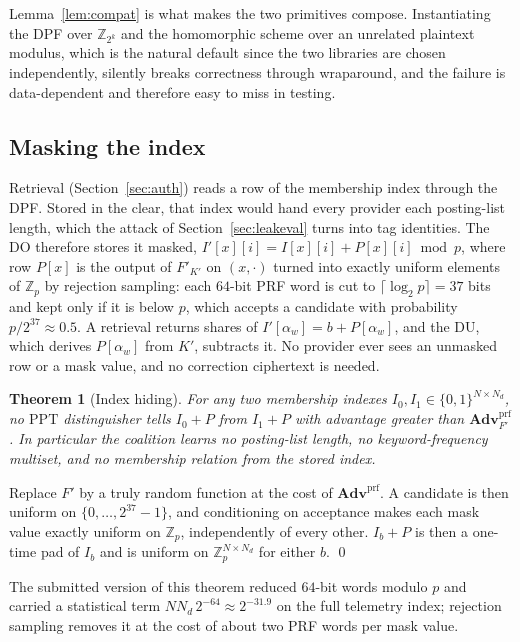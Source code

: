 \documentclass[a4paper,fleqn]{cas-dc}
\newif\ifauthorchecks
\newcommand{\authorcheck}[1]{\ifauthorchecks{\color{red}\textsf{[Authors: #1]}}\fi}
\newtheorem{theorem}{Theorem}
\newcommand{\PPT}{\mathrm{PPT}}
\newcommand{\advPRF}{\mathbf{Adv}^{\mathrm{prf}}}
\begin{document}
Lemma~\ref{lem:compat} is what makes the two primitives compose. Instantiating
the DPF over $\mathbb{Z}_{2^k}$ and the homomorphic scheme over an unrelated
plaintext modulus, which is the natural default since the two libraries are
chosen independently, silently breaks correctness through wraparound, and the
failure is data-dependent and therefore easy to miss in testing.

\subsection{Masking the index}
\label{sec:mask}
Retrieval (Section~\ref{sec:auth}) reads a row of the membership index through
the DPF. Stored in the clear, that index would hand every provider each
posting-list length, which the attack of Section~\ref{sec:leakeval} turns into
tag identities. The DO therefore stores it masked,
$I'[x][i]=I[x][i]+P[x][i]\bmod p$, where row $P[x]$ is the output of
$F'_{K'}$ on $(x,\cdot)$ turned into exactly uniform elements of
$\mathbb{Z}_p$ by rejection sampling: each $64$-bit PRF word is cut to
$\lceil\log_2 p\rceil=37$ bits and kept only if it is below $p$, which accepts
a candidate with probability $p/2^{37}\approx0.5$. A retrieval returns shares
of $I'[\alpha_w]=b+P[\alpha_w]$, and the DU, which derives $P[\alpha_w]$ from
$K'$, subtracts it. No provider ever sees an unmasked row or a mask value, and
no correction ciphertext is needed.

\begin{theorem}[Index hiding]
\label{thm:mask}
For any two membership indexes $I_0,I_1\in\{0,1\}^{N\times N_d}$, no $\PPT$
distinguisher tells $I_0+P$ from $I_1+P$ with advantage greater than
$\advPRF_{F'}$. In particular the coalition learns no posting-list length, no
keyword-frequency multiset, and no membership relation from the stored index.
\end{theorem}
\begin{pf}
Replace $F'$ by a truly random function at the cost of $\advPRF$. A candidate
is then uniform on $\{0,\dots,2^{37}-1\}$, and conditioning on acceptance makes
each mask value exactly uniform on $\mathbb{Z}_p$, independently of every
other. $I_b+P$ is then a one-time pad of $I_b$ and is uniform on
$\mathbb{Z}_p^{N\times N_d}$ for either $b$. \qed
\end{pf}

The submitted version of this theorem reduced $64$-bit words modulo $p$ and
carried a statistical term $N N_d\,2^{-64}\approx2^{-31.9}$ on the full
telemetry index; rejection sampling removes it at the cost of about two PRF
words per mask value. \authorcheck{The C++ prototype still reduces 64-bit
words; port the rejection sampler of the reference implementation
(crshe/prg.py) before re-running Section~\ref{sec:leakeval}.}
\end{document}
